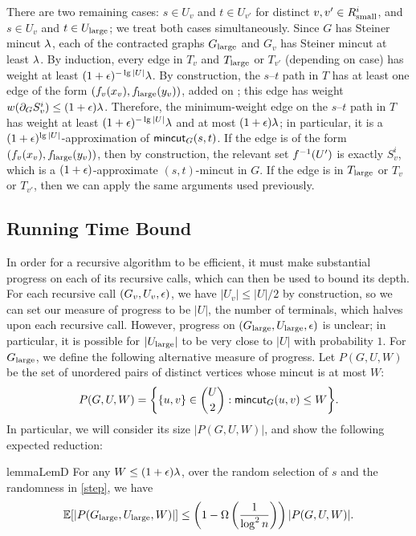 There are two remaining cases: $s\in U_v$ and $t\in U_{v'}$ for distinct $v,v'\in R^i_{\textup{small}}$, and $s\in U_v$ and $t\in U_{\textup{large}}$; we treat both cases simultaneously. Since $G$ has Steiner mincut $\lambda$, each of the contracted graphs $G_{\textup{large}}$ and $G_v$ has Steiner mincut at least $\lambda$. By induction, every edge in $T_v$ and $T_{\textup{large}}$ or $T_{v'}$ (depending on case) has weight at least $(1+\epsilon)^{-\lg|U|}\lambda$. By construction, the $s$--$t$ path in $T$ has at least one edge of the form $(f_v(x_v),f_{\textup{large}}(y_v))$, added on ; this edge has weight $w(\partial_GS^i_v)\le(1+\epsilon)\lambda$. Therefore, the minimum-weight edge on the $s$--$t$ path in $T$ has weight at least $(1+\epsilon)^{-\lg|U|}\lambda$ and at most $(1+\epsilon)\lambda$; in particular, it is a $(1+\epsilon)^{\lg|U|}$-approximation of $\textsf{\textup{mincut}}_G(s,t)$. If the edge is of the form $(f_v(x_v),f_{\textup{large}}(y_v))$, then by construction, the relevant set $f^{-1}(U')$ is exactly $S^i_v$, which is a $(1+\epsilon)$-approximate $(s,t)$-mincut in $G$. If the edge is in $T_{\textup{large}}$ or $T_v$ or $T_{v'}$, then we can apply the same arguments used previously. %
\EP

\subsection{Running Time Bound}

In order for a recursive algorithm to be efficient, it must make substantial progress on each of its recursive calls, which can then be used to bound its depth. For each recursive call $(G_v,U_v,\epsilon)$, we have $|U_v|\le|U|/2$ by construction, so we can set our measure of progress to be $|U|$, the number of terminals, which halves upon each recursive call.
However, progress on $(G_{\textup{large}},U_{\textup{large}},\epsilon)$ is unclear; in particular, it is possible for $|U_{\textup{large}}|$ to be very close to $|U|$ with probability $1$. For $G_{\textup{large}}$, we define the following alternative measure of progress. Let $P(G,U,W)$ be the set of unordered pairs of distinct vertices whose mincut is at most $W$:
\[ P(G,U,W) = \bigg\{ \{u,v\}\in\binom U2:\textsf{\textup{mincut}}_G(u,v)\le W \bigg\} .\]
In particular, we will consider its size $|P(G,U,W)|$, and show the following expected reduction:

\begin{restatable}{lemma}{LemD}
For any $W\le(1+\epsilon)\lambda$, over the random selection of $s$ and the randomness in \ref{step}, we have
\[ \mathbb E[|P(G_{\textup{large}},U_{\textup{large}},W)|] \le \left(1-\Omega\left(\frac1{\log^2n}\right)\right)|P(G,U,W)| .\]
\end{restatable}

